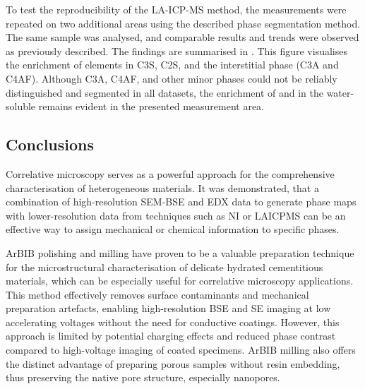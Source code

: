 To test the reproducibility of the LA-ICP-MS method, the measurements were repeated on two additional areas using the described phase segmentation method.
The same sample was analysed, and comparable results and trends were observed as previously described.
The findings are summarised in .
This figure visualises the enrichment of elements in \ac{C3S}, \ac{C2S}, and the interstitial phase (\ac{C3A} and \ac{C4AF}).
Although \ac{C3A}, \ac{C4AF}, and other minor phases could not be reliably distinguished and segmented in all datasets, the enrichment of  and  in the water-soluble  remains evident in the presented measurement area.

\subsection{Conclusions}

Correlative microscopy serves as a powerful approach for the comprehensive characterisation of heterogeneous materials.
It was demonstrated, that a combination of high-resolution \ac{SEM}-\ac{BSE} and \ac{EDX} data to generate phase maps with lower-resolution data from techniques such as \ac{NI} or \ac{LAICPMS} can be an effective way to assign mechanical or chemical information to specific phases.

\ac{ArBIB} polishing and milling have proven to be a valuable preparation technique for the microstructural characterisation of delicate hydrated cementitious materials, which can be especially useful for correlative microscopy applications.
This method effectively removes surface contaminants and mechanical preparation artefacts, enabling high-resolution \ac{BSE} and \ac{SE} imaging at low accelerating voltages without the need for conductive coatings.
However, this approach is limited by potential charging effects and reduced phase contrast compared to high-voltage imaging of coated specimens.
\ac{ArBIB} milling also offers the distinct advantage of preparing porous samples without resin embedding, thus preserving the native pore structure, especially nanopores.

